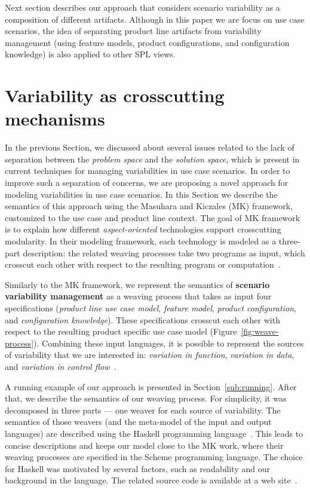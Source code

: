 \documentclass{acm_proc_article-sp}
\begin{document}
Next section describes our approach that considers scenario variability as a
composition of different artifacts. Although in this paper we are focus on use
case scenarios, the idea of separating product line artifacts from variability
management (using feature models, product configurations, and configuration
knowledge) is also applied to other SPL views.


\section{Variability as crosscutting mechanisms}
\label{sec:models}

In the previous Section, we discussed about several issues related to the lack of
separation between the \emph{problem space} and the \emph{solution space}, which
is present in current techniques for managing variabilities in use case
scenarios. In order to improve such a separation of concerns, we are
proposing a novel approach for modeling variabilities in use case scenarios.
In this Section we describe the semantics of this approach using the Masuhara and Kiczales (MK) framework, 
customized to the use case and product line context. The goal of MK framework is to explain how 
different \emph{aspect-oriented} technologies support crosscutting modularity.
In their modeling framework, each technology is modeled as a three-part
description: the related weaving processes take two programs as input, which crosscut each other with respect to the
resulting program or computation~\cite{Masuhara:2003aa}. 

Similarly to the MK framework, we represent the semantics of \textbf{scenario
variability management} as a weaving process that takes as input four
specifications (\emph{product line use case model}, \emph{feature model}, \emph{product
configuration}, and \emph{configuration knowledge}). These
specifications crosscut each other with respect to the resulting product
specific use case model (Figure~\ref{fig:weave-process}). 
Combining these input languages, it is possible
to represent the sources of variability that we are interested in:
\emph{variation in function}, \emph{variation in data}, and
\emph{variation in control flow}~\cite{Bachmann:2001aa}.

A running example of our approach is presented in Section~\ref{sub:running}.
After that, we describe the semantics of our weaving process. For simplicity, it
was decomposed in three parts --- one weaver for each source of variability.  The
semantics of those weavers (and the meta-model of the input and output languages)
are described using the Haskell programming language~\cite{haskell-report}. This
leads to concise descriptions and keeps our model close to the MK
work, where their weaving processes are specified in the Scheme programming
language. The choice for Haskell was motivated by several factors, such as readability and 
our background in the language. The related source code is available at a web
site~\cite{spg-url}.
 
\end{document}
